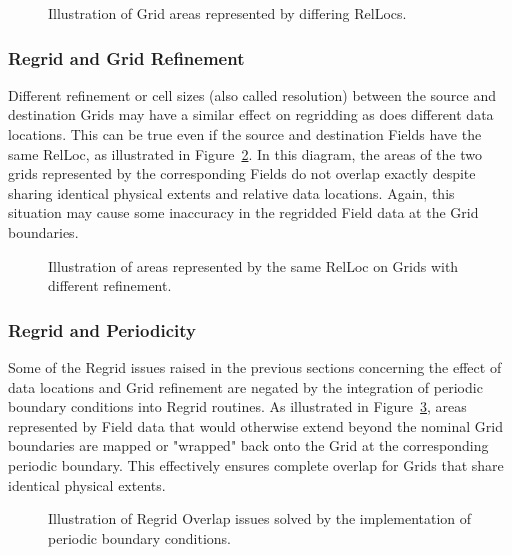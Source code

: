 \begin{center}
\begin{figure}
\caption{Illustration of Grid areas represented by differing RelLocs. }
\label{fig:RegridRelLocEffect}
\end{figure}
\end{center}

\subsubsection{Regrid and Grid Refinement}

Different refinement or cell sizes (also called resolution) between the source
and destination Grids may have a similar effect on regridding as does different
data locations. This can be true even if the source and destination Fields have
the same RelLoc, as illustrated in Figure~\ref{fig:RegridRefinementEffect}.  In
this diagram, the areas of the two grids represented by the corresponding Fields do not overlap
exactly despite sharing identical physical extents and relative data locations.
Again, this situation may cause some inaccuracy in the regridded Field data at
the Grid boundaries.

\begin{center}
\begin{figure}
\caption{Illustration of areas represented by the same RelLoc on Grids with
          different refinement. }
\label{fig:RegridRefinementEffect}
\end{figure}
\end{center}


\subsubsection{Regrid and Periodicity}

Some of the Regrid issues raised in the previous sections concerning the effect
of data locations and Grid refinement are negated by the integration of
periodic boundary conditions into Regrid routines.  As illustrated in
Figure~\ref{fig:RegridPeriodicity}, areas represented by Field data that
would otherwise extend beyond the nominal Grid boundaries are mapped or "wrapped"
back onto the Grid at the corresponding periodic boundary.  This effectively 
ensures complete overlap for Grids that share identical physical extents.

\begin{center}
\begin{figure}
\caption{Illustration of Regrid Overlap issues solved by the implementation
          of periodic boundary conditions. }
\label{fig:RegridPeriodicity}
\end{figure}
\end{center}

